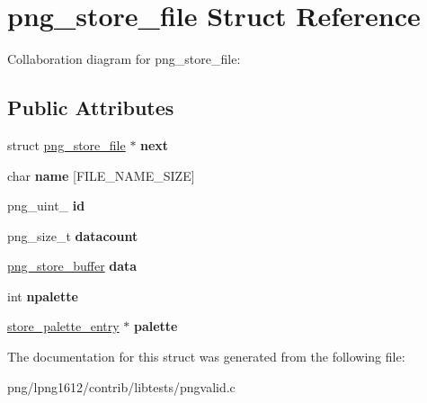 \hypertarget{structpng__store__file}{\section{png\+\_\+store\+\_\+file Struct Reference}
\label{structpng__store__file}
}


Collaboration diagram for png\+\_\+store\+\_\+file\+:
\subsection*{Public Attributes}
\begin{DoxyCompactItemize}
\item 
\hypertarget{structpng__store__file_a30b3d713fdb652a841dfc7c9194e6d05}{struct \hyperlink{structpng__store__file}{png\+\_\+store\+\_\+file} $\ast$ {\bfseries next}}\label{structpng__store__file_a30b3d713fdb652a841dfc7c9194e6d05}

\item 
\hypertarget{structpng__store__file_aff48c43dd3b18315b81a792f3ee55b56}{char {\bfseries name} \mbox{[}F\+I\+L\+E\+\_\+\+N\+A\+M\+E\+\_\+\+S\+I\+Z\+E\mbox{]}}\label{structpng__store__file_aff48c43dd3b18315b81a792f3ee55b56}

\item 
\hypertarget{structpng__store__file_a43214ab1da0df9ee2cfb7e202b36c5ee}{png\+\_\+uint\+\_ {\bfseries id}}\label{structpng__store__file_a43214ab1da0df9ee2cfb7e202b36c5ee}

\item 
\hypertarget{structpng__store__file_ac45862379e97b7fa25c486010f63237a}{png\+\_\+size\+\_\+t {\bfseries datacount}}\label{structpng__store__file_ac45862379e97b7fa25c486010f63237a}

\item 
\hypertarget{structpng__store__file_a581c0816fb2555c807d5c1a8442d7658}{\hyperlink{structpng__store__buffer}{png\+\_\+store\+\_\+buffer} {\bfseries data}}\label{structpng__store__file_a581c0816fb2555c807d5c1a8442d7658}

\item 
\hypertarget{structpng__store__file_a254385504df7041adb1b403ef4869dd1}{int {\bfseries npalette}}\label{structpng__store__file_a254385504df7041adb1b403ef4869dd1}

\item 
\hypertarget{structpng__store__file_a04300534fcecc4617230aab9d1c03a9b}{\hyperlink{structstore__palette__entry}{store\+\_\+palette\+\_\+entry} $\ast$ {\bfseries palette}}\label{structpng__store__file_a04300534fcecc4617230aab9d1c03a9b}

\end{DoxyCompactItemize}


The documentation for this struct was generated from the following file\+:\begin{DoxyCompactItemize}
\item 
png/lpng1612/contrib/libtests/pngvalid.\+c\end{DoxyCompactItemize}
